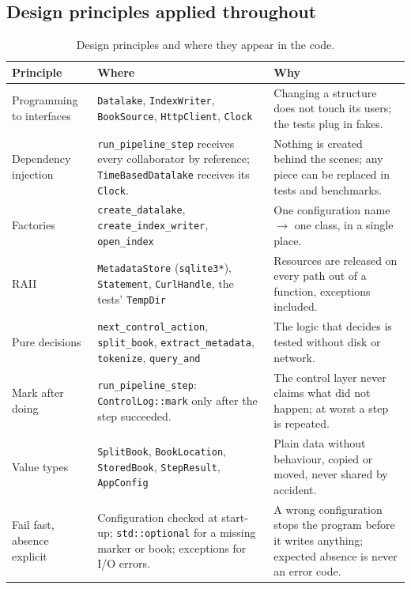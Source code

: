 \documentclass[11pt,a4paper]{article}
\newcommand{\code}[1]{\texttt{#1}}
\begin{document}
\subsection{Design principles applied throughout}
\begin{table}[H]
\centering\small
\begin{tabularx}{\linewidth}{@{}L{3.1cm} Y Y@{}}
\toprule
Principle & Where & Why \\
\midrule
Programming to interfaces & \code{Datalake}, \code{IndexWriter}, \code{BookSource}, \code{HttpClient}, \code{Clock} & Changing a structure does not touch its users; the tests plug in fakes. \\
Dependency injection & \code{run\_pipeline\_step} receives every collaborator by reference; \code{TimeBasedDatalake} receives its \code{Clock}. & Nothing is created behind the scenes; any piece can be replaced in tests and benchmarks. \\
Factories & \code{create\_datalake}, \code{create\_index\_writer}, \code{open\_index} & One configuration name $\rightarrow$ one class, in a single place. \\
RAII & \code{MetadataStore} (\code{sqlite3*}), \code{Statement}, \code{CurlHandle}, the tests' \code{TempDir} & Resources are released on every path out of a function, exceptions included. \\
Pure decisions & \code{next\_control\_action}, \code{split\_book}, \code{extract\_metadata}, \code{tokenize}, \code{query\_and} & The logic that decides is tested without disk or network. \\
Mark after doing & \code{run\_pipeline\_step}: \code{ControlLog::mark} only after the step succeeded. & The control layer never claims what did not happen; at worst a step is repeated. \\
Value types & \code{SplitBook}, \code{BookLocation}, \code{StoredBook}, \code{StepResult}, \code{AppConfig} & Plain data without behaviour, copied or moved, never shared by accident. \\
Fail fast, absence explicit & Configuration checked at start-up; \code{std::optional} for a missing marker or book; exceptions for I/O errors. & A wrong configuration stops the program before it writes anything; expected absence is never an error code. \\
\bottomrule
\end{tabularx}
\caption{Design principles and where they appear in the code.}
\end{table}
\end{document}
